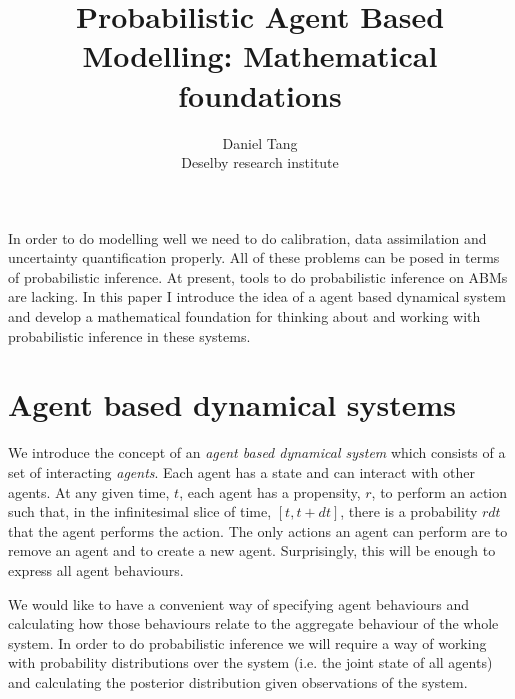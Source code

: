\documentclass[letterpaper,twocolumn,10pt]{article}
\begin{document}
\title{\Large \bf Probabilistic Agent Based Modelling: Mathematical foundations}

\author{
{\rm Daniel Tang}\\
Deselby research institute
}

\maketitle


\abstract
In order to do modelling well we need to do calibration, data assimilation and uncertainty quantification properly. All of these problems can be posed in terms of probabilistic inference. At present, tools to do probabilistic inference on ABMs are lacking. In this paper I introduce the idea of a agent based dynamical system and develop a mathematical foundation for thinking about and working with probabilistic inference in these systems.

\section{Agent based dynamical systems}
We introduce the concept of an \textit{agent based dynamical system} which consists of a set of interacting \textit{agents}. Each agent has a state and can interact with other agents. At any given time, $t$, each agent has a propensity, $r$, to perform an action such that, in the infinitesimal slice of time, $[t, t+dt]$, there is a probability $rdt$ that the agent performs the action. The only actions an agent can perform are to remove an agent and to create a new agent. Surprisingly, this will be enough to express all agent behaviours.

We would like to have a convenient way of specifying agent behaviours and calculating how those behaviours relate to the aggregate behaviour of the whole system. In order to do probabilistic inference we will require a way of working with probability distributions over the system (i.e. the joint state of all agents) and calculating the posterior distribution given observations of the system.
\end{document}
